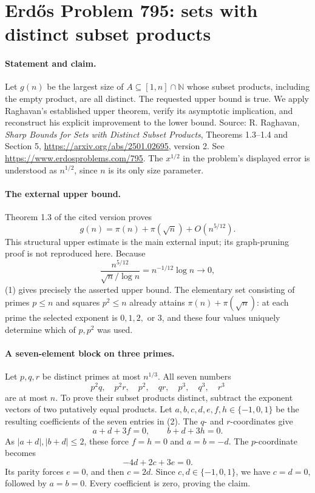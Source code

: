 \section*{Erd\H{o}s Problem 795: sets with distinct subset products}

\paragraph{Statement and claim.}
Let \(g(n)\) be the largest size of \(A\subseteq[1,n]\cap\mathbb N\)
whose subset products, including the empty product, are all distinct.
The requested upper bound is true. We apply Raghavan's
established upper theorem, verify its asymptotic implication,
and reconstruct his explicit improvement to the lower bound.
Source: R. Raghavan, \emph{Sharp Bounds for Sets with Distinct
Subset Products}, Theorems 1.3--1.4 and Section 5,
\url{https://arxiv.org/abs/2501.02695}, version 2.
See \url{https://www.erdosproblems.com/795}.
The \(x^{1/2}\) in the problem's displayed error is understood
as \(n^{1/2}\), since \(n\) is its only size parameter.

\paragraph{The external upper bound.}
Theorem 1.3 of the cited version proves
\[
 g(n)=\pi(n)+\pi(\sqrt n)+O(n^{5/12}).                           \tag{1}
\]
This structural upper estimate is the main external input;
its graph-pruning proof is not reproduced here.
Because
\[
 \frac{n^{5/12}}{\sqrt n/\log n}=n^{-1/12}\log n\longrightarrow0,
\]
(1) gives precisely the asserted upper bound.
The elementary set consisting of primes \(p\leq n\) and
squares \(p^2\leq n\) already attains
\(\pi(n)+\pi(\sqrt n)\): at each prime the selected exponent
is \(0,1,2,\) or \(3\), and these four values uniquely determine
which of \(p,p^2\) was used.

\paragraph{A seven-element block on three primes.}
Let \(p,q,r\) be distinct primes at most \(n^{1/3}\).
All seven numbers
\[
 p^2q,\quad p^2r,\quad p^2,\quad qr,\quad p^3,\quad q^3,\quad r^3
                                                               \tag{2}
\]
are at most \(n\).
To prove their subset products distinct, subtract the exponent
vectors of two putatively equal products.
Let \(a,b,c,d,e,f,h\in\{-1,0,1\}\) be the resulting coefficients
of the seven entries in (2).
The \(q\)- and \(r\)-coordinates give
\[
 a+d+3f=0,\qquad b+d+3h=0.
\]
As \(|a+d|,|b+d|\leq2\), these force
\(f=h=0\) and \(a=b=-d\).
The \(p\)-coordinate becomes
\[
 -4d+2c+3e=0.
\]
Its parity forces \(e=0\), and then \(c=2d\).
Since \(c,d\in\{-1,0,1\}\), we have \(c=d=0\), followed
by \(a=b=0\). Every coefficient is zero, proving the claim.

